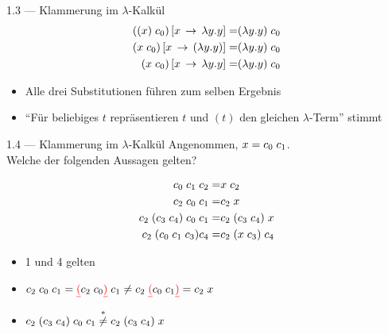 \documentclass{beamer}
\begin{document}
\newcommand{\subst}[3]{(#1)\left[#2\,\to\,#3\right]}

\setcounter{equation}{0}

\begin{frame}{1.3 --- Klammerung im $\lambda$-Kalkül}
	\begin{eqnarray}
		\subst{\liin{(x)}{c_0}}{x}{\abs{y}{y}} =& \liin{(\abs{y}{y})}{c_0} \\
		\subst{\liin{x}{c_0}}{x}{(\abs{y}{y})} =& \liin{(\abs{y}{y})}{c_0} \\
		\subst{\liin{x}{c_0}}{x}{\abs{y}{y}} =& \liin{(\abs{y}{y})}{c_0}
	\end{eqnarray}

	\begin{itemize}
		\item Alle drei Substitutionen führen zum selben Ergebnis
		\item \enquote{Für beliebiges $t$ repräsentieren $t$ und $(t)$ den gleichen $\lambda$-Term} stimmt
	\end{itemize}
\end{frame}

\setcounter{equation}{0}

\begin{frame}{1.4 --- Klammerung im $\lambda$-Kalkül}
	Angenommen, $x = c_0\;{}c_1$.\\
	Welche der folgenden Aussagen gelten?

	\begin{eqnarray}
		c_0\;{}c_1\;{}c_2                 =& x\;{}c_2 \\
		c_2\;{}c_0\;{}c_1                 =& c_2\;{}x \\
		c_2\;{}(c_3\;{}c_4)\;{}c_0\;{}c_1  =& c_2\;{}(c_3\;{}c_4)\;{}x \\
		c_2\;{}(c_0\;{}c_1\;{}c_3){c_4} =& c_2\;{}(x\;{}c_3)\;{}c_4
	\end{eqnarray}

	\pause

	\begin{itemize}
		\item 1 und 4 gelten
		\item $c_2\;{}c_0\;{}c_1 = \textcolor{red}{\underline{(}}c_2\;{}c_0\textcolor{red}{\underline{)}}\;{}c_1 \neq c_2\;{}\textcolor{red}{\underline{(}}c_0\;{}c_1\textcolor{red}{\underline{)}} = c_2\;{}x$
		\item $c_2\;{}(c_3\;{}c_4)\;{}c_0\;{}c_1 \stackrel{*}{\neq} c_2\;{}(c_3\;{}c_4)\;{}x$
	\end{itemize}
\end{frame}
\end{document}
